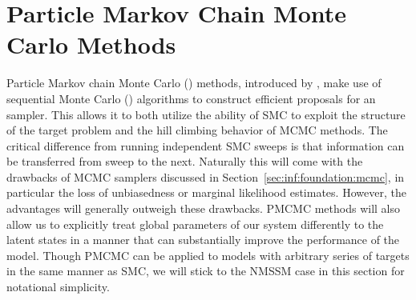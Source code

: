 
\section{Particle Markov Chain Monte Carlo Methods}
\label{sec:part:pmcmc}

Particle Markov chain Monte Carlo (\pmcmc) methods, introduced by \citet{andrieuDH2010}, make use of 
sequential Monte Carlo (\smc) algorithms \citep{gordon1993novel,doucet2001sequential} to construct 
efficient proposals for an \mcmc sampler. This allows it to both utilize the ability of SMC to
exploit the structure of the target problem and the hill climbing behavior of MCMC methods.
The critical difference from running independent SMC sweeps is that information can be transferred
from sweep to the next. 
Naturally this will come with the drawbacks of MCMC samplers
discussed in Section~\ref{sec:inf:foundation:mcmc}, in particular the loss of unbiasedness or marginal likelihood estimates.
However, the advantages will generally outweigh these drawbacks.  PMCMC methods will also allow us to explicitly
treat global parameters of our system differently to the latent states in a manner that can substantially improve
the performance of the model.
Though PMCMC can be applied to models with arbitrary series of targets in the same manner as SMC, we will stick
to the NMSSM case in this section for notational simplicity.

